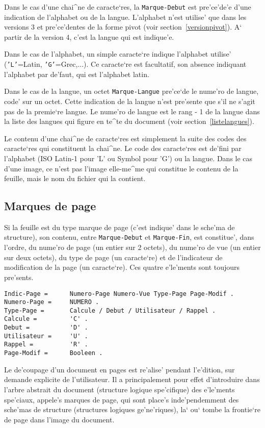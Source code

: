 Dans le cas d'une chai^ne de caracte`res, la {\tt Marque-Debut} est
pre'ce'de'e d'une indication de l'alphabet ou de la langue. L'alphabet
n'est utilise' que dans les versions 3 et pre'ce'dentes de la forme
pivot (voir section~\ref{versionpivot}). A` partir de la version 4, c'est
la langue qui est indique'e.

Dans le cas de l'alphabet, un simple caracte`re indique l'alphabet utilise'
({\tt 'L'}=Latin, {\tt 'G'}=Grec,...). Ce caracte`re est facultatif, son
absence indiquant l'alphabet par de'faut, qui est l'alphabet latin.

Dans le cas de la langue, un octet {\tt Marque-Langue} pre'ce`de le nume'ro
de langue, code' sur un octet. Cette indication de la langue n'est pre'sente
que s'il ne s'agit pas de la premie`re langue. Le nume'ro de langue est le
rang - 1 de la langue dans la liste des langues qui figure en te^te du
document (voir section~\ref{listelangues}).

Le contenu d'une chai^ne de caracte`res est simplement la suite des codes
des caracte`res qui constituent la chai^ne. Le code des caracte`res est
de'fini par l'alphabet (ISO Latin-1 pour 'L' ou Symbol pour 'G') ou la langue.
Dans le cas d'une image, ce n'est pas l'image elle-me^me qui constitue le
contenu de la feuille, mais le nom du fichier qui la contient.

\subsection{Marques de page}

Si la feuille est du type marque de page (c'est indique' dans le sche'ma de
structure), son contenu, entre {\tt Marque-Debut} et {\tt Marque-Fin}, est
constitue', dans l'ordre, du nume'ro de page (un entier sur 2 octets), du
nume'ro de vue (un entier sur deux octets), du type de page (un caracte`re)
et de l'indicateur de modification de la page (un caracte`re). Ces quatre
e'le'ments sont toujours pre'sents.

\begin{verbatim}
Indic-Page =      Numero-Page Numero-Vue Type-Page Page-Modif .
Numero-Page =     NUMERO .
Type-Page =       Calcule / Debut / Utilisateur / Rappel .
Calcule =         'C' .
Debut =           'D' .
Utilisateur =     'U' .
Rappel =          'R' .
Page-Modif =      Booleen .
\end{verbatim}

Le de'coupage d'un document en pages est re'alise' pendant l'e'dition, sur
demande explicite de l'utilisateur. Il a principalement pour effet
d'introduire dans l'arbre abstrait du document (structure logique spe'cifique)
des e'le'ments spe'ciaux, appele's marques de page, qui sont place's
inde'pendemment des sche'mas de structure (structures logiques ge'ne'riques),
la` ou` tombe la frontie`re de page dans l'image du document.

